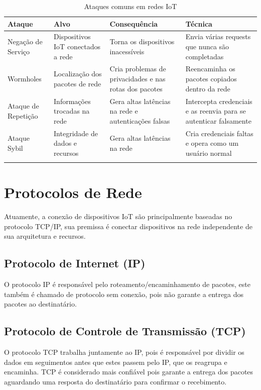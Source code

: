 \hfill
{}
\begin{table}[!hbt]
\renewcommand\thetable{1}
\setlength\tabcolsep{3pt} 
\caption{Ataques comuns em redes IoT}
\centering
 \begin{tabularx}{\textwidth}{@{}*{4}{L} @{}} 
 \toprule
 Ataque & Alvo & Consequência & Técnica \\ [0.5ex]
 \midrule
 Negação de Serviço &
 Dispositivos IoT conectados a rede &
 Torna os dispositivos inacessíveis &
 Envia várias requests que nunca são completadas \\ 
 \addlinespace
 Wormholes &
 Localização dos pacotes de rede &
 Cria problemas de privacidades e nas rotas dos pacotes &
 Reencaminha os pacotes copiados dentro da rede \\ 
 \addlinespace
 Ataque de Repetição &
 Informações trocadas na rede &
 Gera altas latências na rede e autenticações falsas &
 Intercepta credenciais e as reenvia para se autenticar falsamente \\ 
 \addlinespace
 Ataque Sybil &
 Integridade de dados e recursos &
 Gera altas latências na rede &
 Cria credenciais faltas e opera como um usuário normal \\ 
 \addlinespace
 \bottomrule
\end{tabularx}
\end{table}

\section{Protocolos de Rede}
Atuamente, a conexão de dispositivos IoT são principalmente baseadas no protocolo TCP/IP, sua premissa é conectar dispositivos na rede independente de sua arquitetura e recursos. \cite{Djama}

\subsection{Protocolo de Internet (IP)}
O protocolo IP é responsável pelo roteamento/encaminhamento de pacotes, este também é chamado de protocolo sem conexão, pois não garante a entrega dos pacotes ao destinatário. \cite{alqahtani2013tcp}

\subsection{Protocolo de Controle de Transmissão (TCP)}
O protocolo TCP trabalha juntamente ao IP, pois é responsável por dividir os dados em seguimentos antes que estes passem pelo IP, que os reagrupa e encaminha. TCP é considerado mais confiável pois garante a entrega dos pacotes aguardando uma resposta do destinatário para confirmar o recebimento. \cite{alqahtani2013tcp}

